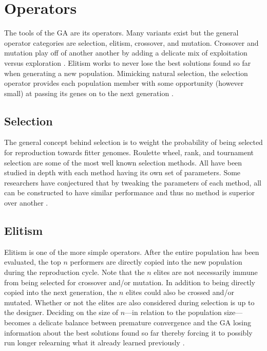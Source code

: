 \section{Operators}

The tools of the GA are its operators. Many variants exist but the general operator categories are selection, elitism, crossover, and mutation. Crossover and mutation play off of another another by adding a delicate mix of exploitation versus exploration \cite{Beasley93anoverview}. Elitism works to never lose the best solutions found so far when generating a new population. Mimicking natural selection, the selection operator provides each population member with some opportunity (however small) at passing its genes on to the next generation \cite{Beasley93anoverview}.      

\subsection{Selection}

The general concept behind selection is to weight the probability of being selected for reproduction towards fitter genomes. Roulette wheel, rank, and tournament selection are some of the most well known selection methods. All have been studied in depth with each method having its own set of parameters. Some researchers have conjectured that by tweaking the parameters of each method, all can be constructed to have similar performance and thus no method is superior over another \cite{Beasley93anoverview}.    

\subsection{Elitism}

Elitism is one of the more simple operators. After the entire population has been evaluated, the top $n$ performers are directly copied into the new population during the reproduction cycle. Note that the $n$ elites are not necessarily immune from being selected for crossover and/or mutation. In addition to being directly copied into the next generation, the $n$ elites could also be crossed and/or mutated. Whether or not the elites are also considered during selection is up to the designer. Deciding on the size of $n$---in relation to the population size---becomes a delicate balance between premature convergence and the GA losing information about the best solutions found so far thereby forcing it to possibly run longer relearning what it already learned previously \cite{DanWDyer}. 

